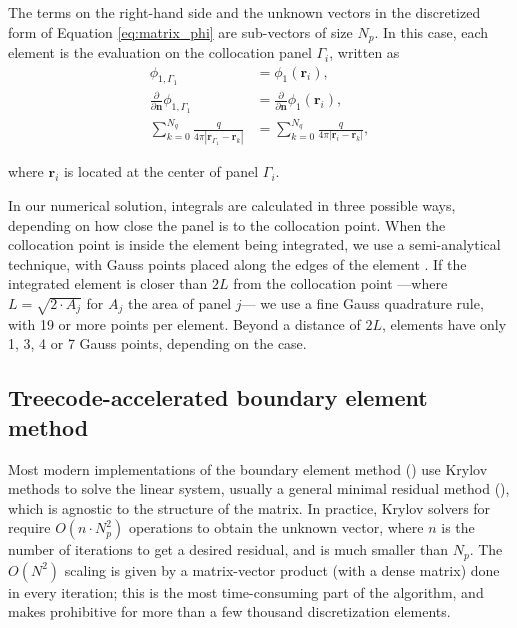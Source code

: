The terms on the right-hand side and the unknown vectors in the discretized form of Equation \eqref{eq:matrix_phi} are sub-vectors of size $N_p$. In this case, each element is the evaluation on the collocation panel $\Gamma_i$, written as
%
\begin{align} \label{eq:vector_disc}
\phi_{1,\Gamma_1} &= \phi_1(\mathbf{r}_i), \nonumber \\
\frac{\partial}{\partial \mathbf{n}}\phi_{1,\Gamma_1} &= \frac{\partial}{\partial \mathbf{n}}\phi_1(\mathbf{r}_i), \nonumber \\
\sum_{k=0}^{N_q} \frac{q}{4\pi|\mathbf{r}_{\Gamma_1} - \mathbf{r}_k|} &= \sum_{k=0}^{N_q} \frac{q}{4\pi|\mathbf{r}_i - \mathbf{r}_k|},
\end{align}

\noindent where $\mathbf{r}_i$ is located at the center of panel $\Gamma_i$.


In our numerical solution, integrals are calculated in three possible ways, depending on how close the panel is to the collocation point. When the collocation point is inside the element being integrated, we use a semi-analytical technique, with Gauss points placed along the edges of the element \cite[p.~49, ff.]{HessSmith1967}\cite{ZhuHuangSongWhite2001}. If the integrated element is closer than $2L$ from the collocation point ---where $L = \sqrt{2\cdot A_j}$ for $A_j$ the area of panel $j$--- we use a fine Gauss quadrature rule, with 19 or more points per element. Beyond a distance of $2L$, elements have only 1, 3, 4 or 7 Gauss points, depending on the case.


\subsection{Treecode-accelerated boundary element method}

Most modern implementations of the boundary element method (\bem) use Krylov methods to solve the linear system, usually a general minimal residual method (\gmres), which is agnostic to the structure of the matrix. In practice, Krylov solvers for \bem require $O(n \cdot N_p^2)$ operations to obtain the unknown vector, where $n$ is the number of iterations to get a desired residual, and is much smaller than $N_p$. The $O(N^2)$ scaling is given by a matrix-vector product (with a dense matrix) done in every iteration; this is the most time-consuming part of the algorithm, and makes \bem prohibitive for more than a few thousand discretization elements. 

